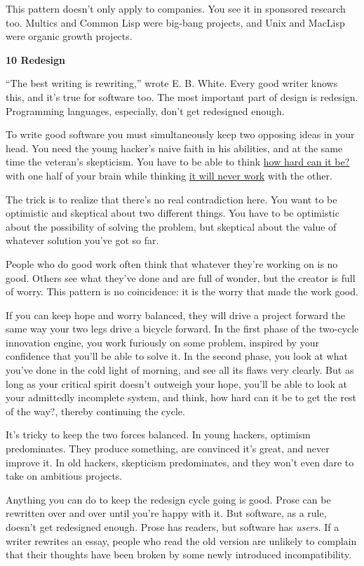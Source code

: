 \documentclass[12pt]{book}
\begin{document}
This pattern doesn't only apply to companies. You see it in sponsored
research too. Multics and Common Lisp were big-bang projects, and Unix
and MacLisp were organic growth projects.

\textbf{10 Redesign}

``The best writing is rewriting,'' wrote E. B. White. Every good writer
knows this, and it's true for software too. The most important part of
design is redesign. Programming languages, especially, don't get
redesigned enough.

To write good software you must simultaneously keep two opposing ideas
in your head. You need the young hacker's naive faith in his abilities,
and at the same time the veteran's skepticism. You have to be able to
think \href{http://www.trevorblackwell.com}{how hard can it be?} with
one half of your brain while thinking
\href{http://www.pdos.lcs.mit.edu/~rtm/}{it will never work} with the
other.

The trick is to realize that there's no real contradiction here. You
want to be optimistic and skeptical about two different things. You have
to be optimistic about the possibility of solving the problem, but
skeptical about the value of whatever solution you've got so far.

People who do good work often think that whatever they're working on is
no good. Others see what they've done and are full of wonder, but the
creator is full of worry. This pattern is no coincidence: it is the
worry that made the work good.

If you can keep hope and worry balanced, they will drive a project
forward the same way your two legs drive a bicycle forward. In the first
phase of the two-cycle innovation engine, you work furiously on some
problem, inspired by your confidence that you'll be able to solve it. In
the second phase, you look at what you've done in the cold light of
morning, and see all its flaws very clearly. But as long as your
critical spirit doesn't outweigh your hope, you'll be able to look at
your admittedly incomplete system, and think, how hard can it be to get
the rest of the way?, thereby continuing the cycle.

It's tricky to keep the two forces balanced. In young hackers, optimism
predominates. They produce something, are convinced it's great, and
never improve it. In old hackers, skepticism predominates, and they
won't even dare to take on ambitious projects.

Anything you can do to keep the redesign cycle going is good. Prose can
be rewritten over and over until you're happy with it. But software, as
a rule, doesn't get redesigned enough. Prose has readers, but software
has \emph{users.} If a writer rewrites an essay, people who read the old
version are unlikely to complain that their thoughts have been broken by
some newly introduced incompatibility.
\end{document}
